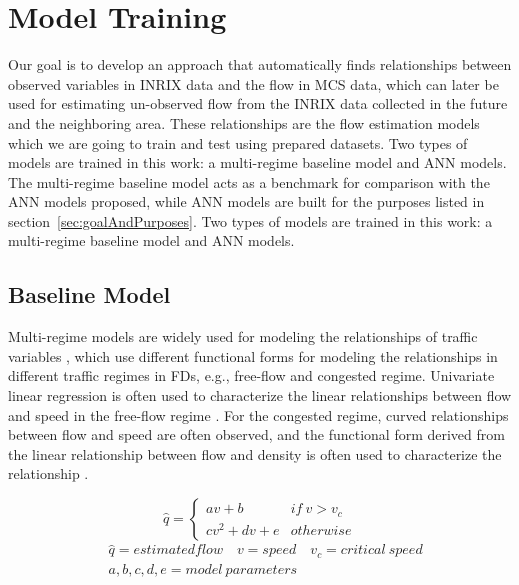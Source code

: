 \documentclass[english]{kththesis}
\begin{document}
\section{Model Training}
\label{sec:modelTraining}
Our goal is to develop an approach that automatically finds relationships between observed variables in INRIX data and the flow in MCS data, which can later be used for estimating un-observed flow from the INRIX data collected in the future and the neighboring area. These relationships are the flow estimation models which we are going to train and test using prepared datasets. Two types of models are trained in this work: a multi-regime baseline model and ANN models. The multi-regime baseline model acts as a benchmark for comparison with the ANN models proposed, while ANN models are built for the purposes listed in section~\ref{sec:goalAndPurposes}. Two types of models are trained in this work: a multi-regime baseline model and ANN models.

\subsection{Baseline Model}
\label{subsec:baselineModel}
Multi-regime models are widely used for modeling the relationships of traffic variables \cite{tsanakas_emission_estimation, blandin_individual_speed, antoniou_ml_estimation, nielsen_flow-speed_relations}, which use different functional forms for modeling the relationships in different traffic regimes in FDs, e.g., free-flow and congested regime. Univariate linear regression is often used to characterize the linear relationships between flow and speed in the free-flow regime \cite{blandin_individual_speed, nielsen_flow-speed_relations}. For the congested regime, curved relationships between flow and speed are often observed, and the functional form derived from the linear relationship between flow and density is often used to characterize the relationship \cite{blandin_individual_speed, nielsen_flow-speed_relations}.

\begin{equation}
    \hat{q} = 
    \left \{\begin{matrix}
    av + b & if \ v > v_c\\ 
    cv^2 + dv + e & otherwise
    \end{matrix}\right.
    \label{eq:baseline}
\end{equation}
\begin{align*}
    & \hat{q} = estimated flow \quad v = speed \quad v_c=critical \ speed \\
    & a,b,c,d,e=model \ parameters
\end{align*}
\end{document}
